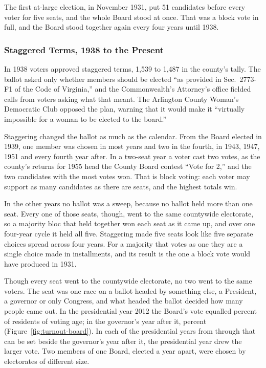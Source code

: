 The first at-large election, in November 1931, put 51 candidates before every voter
for five seats, and the whole Board stood at once.\autocite[67]{anderson1958}
That was a block vote in full, and the Board stood together again every four years
until 1938.

\subsubsection{Staggered Terms, 1938 to the Present}

In 1938 voters approved staggered terms, 1,539 to 1,487 in the county's
tally.\autocite[11]{arlingtonelections2021}\fnsep\autocite{sun1938referendum} The
ballot asked only whether members should be elected ``as provided in Sec.~2773-F1
of the Code of Virginia,'' and the Commonwealth's Attorney's office fielded calls
from voters asking what that meant. The Arlington County Woman's Democratic Club
opposed the plan, warning that it would make it ``virtually impossible for a woman
to be elected to the board.''\autocite{sun1938referendum}

Staggering changed the ballot as much as the calendar. From the Board elected in
1939, one member was chosen in most years and two in the fourth, in 1943, 1947,
1951 and every fourth year after.\autocite[37]{arlhist1967officials}
In a two-seat year a voter cast two votes, as the county's returns for 1955 head
the County Board contest ``Vote for 2,'' and the two candidates with the most votes
won.\autocite[28]{arlingtonelections2021} That is block voting: each voter may
support as many candidates as there are seats, and the highest totals win.

In the other years no ballot was a sweep, because no ballot held more than one seat.
Every one of those seats, though, went to the same countywide electorate, so a
majority bloc that held together won each seat as it came up, and over one
four-year cycle it held all five. Staggering made five seats look like five
separate choices spread across four years. For a majority that votes as one they
are a single choice made in installments, and its result is the one a block vote
would have produced in 1931.

Though every seat went to the countywide electorate, no two went to the same
voters. The seat was one race on a ballot headed by something else, a President, a
governor or only Congress, and what headed the ballot decided how many people came
out. In the presidential year 2012 the Board's vote equalled
\boardVoteTwoThousandTwelve{} percent of residents of voting age; in the governor's
year after it, \boardVoteTwoThousandThirteen{} percent
(Figure~\ref{fig:turnout-board}). In each of the \boardPairs{} presidential years from
\boardPairsFirst{} through \boardPairsLast{} that can be set beside the governor's
year after it, the presidential year drew the larger vote. Two members of one Board,
elected a year apart, were chosen by electorates of different size.

